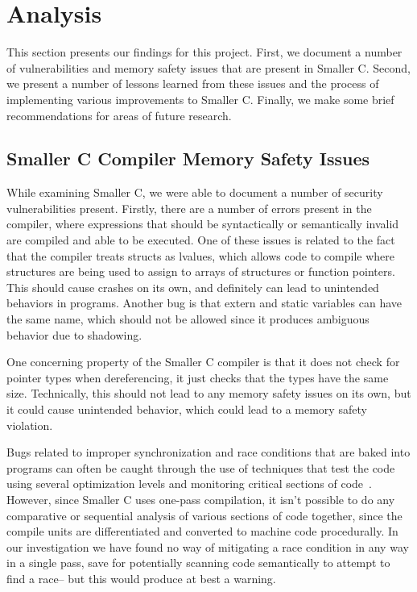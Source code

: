 \documentclass[sigconf, anonymous]{acmart}
\begin{document}


\section{Analysis}
\label{analysis}

This section presents our findings for this project. First, we document a number of vulnerabilities and memory safety issues that are present in Smaller C. Second, we present a number of lessons learned from these issues and the process of implementing various improvements to Smaller C. Finally, we make some brief recommendations for areas of future research.

\subsection{Smaller C Compiler Memory Safety Issues}

While examining Smaller C, we were able to document a number of security vulnerabilities present.
Firstly, there are a number of errors present in the compiler, where expressions that should be syntactically or semantically invalid are compiled and able to be executed. One of these issues is related to the fact that the compiler treats structs as lvalues, which allows code to compile where structures are being used to assign to arrays of structures or function pointers. This should cause crashes on its own, and definitely can lead to unintended behaviors in programs. Another bug is that extern and static variables can have the same name, which should not be allowed since it produces ambiguous behavior due to shadowing. 

One concerning property of the Smaller C compiler is that it does not check for pointer types when dereferencing, it just checks that the types have the same size. Technically, this should not lead to any memory safety issues on its own, but it could cause unintended behavior, which could lead to a memory safety violation. 

Bugs related to improper synchronization and race conditions that are baked into programs can often be caught through the use of techniques that test the code using several optimization levels and monitoring critical sections of code~\cite{Li:Finding}. However, since Smaller C uses one-pass compilation, it isn’t possible to do any comparative or sequential analysis of various sections of code together, since the compile units are differentiated and converted to machine code procedurally. In our investigation we have found no way of mitigating a race condition in any way in a single pass, save for potentially scanning code semantically to attempt to find a race– but this would produce at best a warning.
\end{document}
